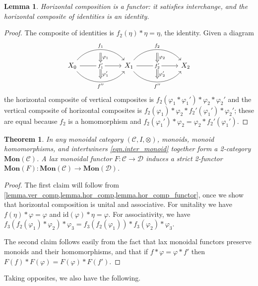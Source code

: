 \documentclass[11pt, one side, article]{memoir}
\theoremstyle{definition}
\theoremstyle{plain}
\newtheorem{theorem}[definitionx]{Theorem}
\newtheorem{lemma}[definitionx]{Lemma}
\newcommand{\cat}[1]{\mathcal{#1}}%
\newcommand{\Cat}[1]{\mathbf{#1}}%
\newcommand{\id}{\mathrm{id}}
\newcommand{\0}{\textsf{0}}
\newcommand{\1}{\tn{\textsf{1}}}
\begin{document}
\begin{lemma}\label{lemma.hor_comp_functor}
Horizontal composition is a functor: it satisfies interchange, and the horizontal composite of identities is an identity.
\end{lemma}
\begin{proof}
The composite of identities is $f_2(\eta)*\eta=\eta$, the identity. Given a diagram
\[
\begin{tikzcd}[column sep=60pt]
	X_0\ar[r, bend left=50pt, "f_1", ""' name=a1]\ar[r, "f_1'" description, "" name=b11, ""' name=b12]\ar[r, bend right=50pt, "f''"', "" name=c1]&
	X_1\ar[r, bend left=50pt, "f_2", ""' name=a2]\ar[r, "f_2'" description, "" name=b21, ""' name=b22]\ar[r, bend right=50pt, "f''"', "" name=c2]&
	X_2
	\ar[from=a1, to=b11, Rightarrow, "\varphi_1"]
	\ar[from=b12, to=c1, Rightarrow, "\varphi_1'"]
	\ar[from=a2, to=b21, Rightarrow, "\varphi_2"]
	\ar[from=b22, to=c2, Rightarrow, "\varphi_2'"]
\end{tikzcd}
\]
the horizontal composite of vertical composites is $f_2(\varphi_1*\varphi_1')*\varphi_2*\varphi_2'$ and the vertical composite of horizontal composites is $f_2(\varphi_1)*\varphi_2*f_2'(\varphi_1')*\varphi_2'$; these are equal because $f_2$ is a homomorphism and $f_2(\varphi_1')*\varphi_2=\varphi_2*f_2'(\varphi_1')$.
\end{proof}

\begin{theorem}\label{thm.main}
In any monoidal category $(\cat{C},I,\otimes)$, monoids, monoid homomorphisms, and intertwiners \eqref{eqn.inter_monoid} together form a 2-category $\Cat{Mon}(\cat{C})$. A lax monoidal functor $F\colon\cat{C}\to\cat{D}$ induces a strict 2-functor $\Cat{Mon}(F)\colon\Cat{Mon}(\cat{C})\to\Cat{Mon}(\cat{D})$.
\end{theorem}
\begin{proof}
The first claim will follow from \cref{lemma.ver_comp,lemma.hor_comp,lemma.hor_comp_functor}, once we show that horizontal composition is unital and associative. For unitality we have $f(\eta)*\varphi=\varphi$ and $\id(\varphi)*\eta=\varphi$. For associativity, we have $f_3(f_2(\varphi_1)*\varphi_2)*\varphi_3=f_3(f_2(\varphi_1))*f_3(\varphi_2)*\varphi_3$.

The second claim follows easily from the fact that lax monoidal functors preserve monoids and their homomorphisms, and that if $f*\varphi=\varphi*f'$ then $F(f)*F(\varphi)=F(\varphi)*F(f')$.
\end{proof}

Taking opposites, we also have the following.
\end{document}
